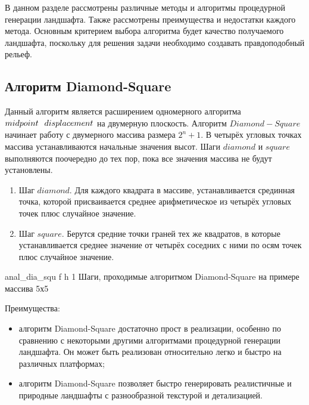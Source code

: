 В данном разделе рассмотрены различные методы и алгоритмы процедурной генерации ландшафта. Также рассмотрены преимущества и недостатки каждого метода. Основным критерием выбора алгоритма будет качество получаемого ландшафта, поскольку для решения задачи необходимо создавать правдоподобный рельеф.

\subsection{Алгоритм Diamond-Square}

Данный алгоритм является расширением одномерного алгоритма $midpoint \hspace{0.25cm} displacement$ на двумерную плоскость. Алгоритм $Diamond-Square$ начинает работу с двумерного массива размера $2^n + 1$. В четырёх угловых точках массива устанавливаются начальные значения высот. Шаги $diamond$ и $square$ выполняются поочередно до тех пор, пока все значения массива не будут установлены.

\begin{enumerate}[label={\arabic*)}]
    \item Шаг $diamond$. Для каждого квадрата в массиве, устанавливается срединная точка, которой присваивается среднее арифметическое из четырёх угловых точек плюс случайное значение.
	\item Шаг $square$. Берутся средние точки граней тех же квадратов, в которые устанавливается среднее значение от четырёх соседних с ними по осям точек плюс случайное значение.
\end{enumerate}

{anal_dia_squ} %
{f} %
{h} %
{1\textwidth} %
{Шаги, проходимые алгоритмом Diamond-Square на примере массива 5х5} %

\clearpage

Преимущества: 

\begin{itemize}[label=--]
	\item алгоритм Diamond-Square достаточно прост в реализации, особенно по сравнению с некоторыми другими алгоритмами процедурной генерации ландшафта. Он может быть реализован относительно легко и быстро на различных платформах;
	\item алгоритм Diamond-Square позволяет быстро генерировать реалистичные и природные ландшафты с разнообразной текстурой и детализацией. 
\end{itemize}

